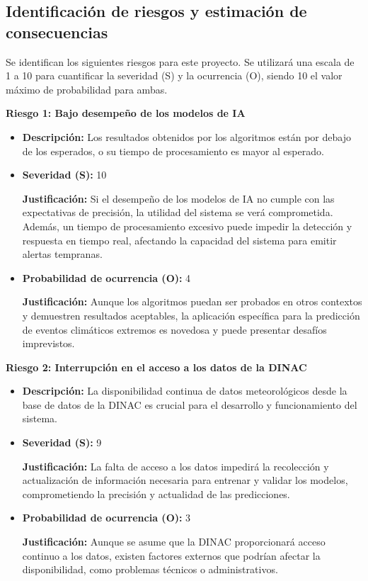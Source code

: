 \documentclass[
11pt, %
codirector, %
]{charter}
\begin{document}
\subsection{Identificación de riesgos y estimación de consecuencias}

Se identifican los siguientes riesgos para este proyecto. Se utilizará una escala de 1 a 10 para cuantificar la severidad (S) y la ocurrencia (O), siendo 10 el valor máximo de probabilidad para ambas.

\textbf{Riesgo 1: Bajo desempeño de los modelos de IA}
\begin{itemize}
  \item \textbf{Descripción:} Los resultados obtenidos por los algoritmos están por debajo de los esperados, o su tiempo de procesamiento es mayor al esperado.
  \item \textbf{Severidad (S):} 10
  
  \textbf{Justificación:} Si el desempeño de los modelos de IA no cumple con las expectativas de precisión, la utilidad del sistema se verá comprometida. Además, un tiempo de procesamiento excesivo puede impedir la detección y respuesta en tiempo real, afectando la capacidad del sistema para emitir alertas tempranas.
  \item \textbf{Probabilidad de ocurrencia (O):} 4
  
  \textbf{Justificación:} Aunque los algoritmos puedan ser probados en otros contextos y demuestren resultados aceptables, la aplicación específica para la predicción de eventos climáticos extremos es novedosa y puede presentar desafíos imprevistos.
\end{itemize}

\textbf{Riesgo 2: Interrupción en el acceso a los datos de la DINAC}

\begin{itemize}
  \item \textbf{Descripción:} La disponibilidad continua de datos meteorológicos desde la base de datos de la DINAC es crucial para el desarrollo y funcionamiento del sistema.
  \item \textbf{Severidad (S):} 9
  
  \textbf{Justificación:} La falta de acceso a los datos impedirá la recolección y actualización de información necesaria para entrenar y validar los modelos, comprometiendo la precisión y actualidad de las predicciones.
  \item \textbf{Probabilidad de ocurrencia (O):} 3
  
  \textbf{Justificación:} Aunque se asume que la DINAC proporcionará acceso continuo a los datos, existen factores externos que podrían afectar la disponibilidad, como problemas técnicos o administrativos.
\end{itemize}
\end{document}
